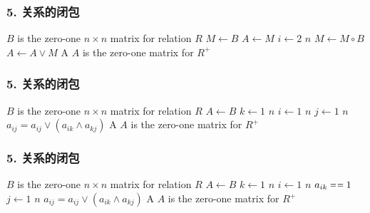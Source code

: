 \documentclass{beamer}
\begin{document}
\begin{CJK*}{UTF8}{gbsn}
\begin{frame}
  \frametitle{5. 关系的闭包}
  \begin{codebox}
    \zi \Comment $B$ is the zero-one $n \times n$ matrix for relation $R$
    \li $M \gets B$
    \li $A \gets M$
    \li \For $i \gets 2$ \To $n$
    \li \Do
        $M \gets M \circ B$
    \li $A \gets A \lor M$
    \End
    \li \Return A \Comment $A$ is the zero-one matrix for $R^+$
  \end{codebox}
  
\end{frame}

\begin{frame}
  \frametitle{5. 关系的闭包}
  \begin{codebox}
    \zi \Comment $B$ is the zero-one $n \times n$ matrix for relation $R$
    \li $A \gets B$
    \li \For $k \gets 1$ \To $n$
    \li \Do
    \For $i \gets 1$ \To $n$
    \li \Do
    \For $j \gets 1$ \To $n$
    \li \Do
    $a_{ij} = a_{ij} \lor (a_{ik} \land a_{kj})$
    \End
    \End
    \End
    \li \Return A \Comment $A$ is the zero-one matrix for $R^+$
  \end{codebox}  
\end{frame}

\begin{frame}
  \frametitle{5. 关系的闭包}
  \begin{codebox}
    \zi \Comment $B$ is the zero-one $n \times n$ matrix for relation $R$
    \li $A \gets B$
    \li \For $k \gets 1$ \To $n$
    \li \Do
    \For $i \gets 1$ \To $n$
    \li \Do
     \If $a_{ik} \isequal 1$
    \li \Then
    \For $j \gets 1$ \To $n$
    \li \Do
    $a_{ij} = a_{ij} \lor (a_{ik} \land a_{kj})$
    \End
    \End
    \End
    \End
    \li \Return A \Comment $A$ is the zero-one matrix for $R^+$
  \end{codebox}  
\end{frame}



\end{CJK*}
\end{document}
